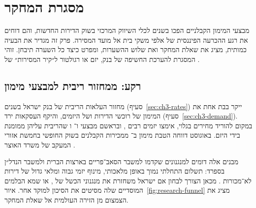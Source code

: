 \chapter{מסגרת המחקר}
\label{ch:research-framework}

\begin{managerbox}
מבצעי המימון הקבלניים הפכו בשנים  לכלי השיווק המרכזי בשוק הדירות החדשות, והם דוחים את רגע ההכרעה הפיננסית של אלפי משקי בית אל מועד המסירה. פרק זה מגדיר את הבעיה כמותית, מציג את שאלת המחקר ואת שלוש ההשערות, ומפרט כיצד כל השערה תיבחן. זוהי המסגרת להערכת החשיפה של בנק, יזם או רגולטור ל״קיר המסירות״ של .
\end{managerbox}

\section{רקע: ממחזור ריבית למבצעי מימון}
\label{sec:ch1-background}

מחזור העלאות הריבית של בנק ישראל בשנים  (סעיף~\ref{sec:ch3-rates}) ייקר בבת אחת את המימון של רוכשי הדירות ושל היזמים, והיקף העסקאות ירד (סעיף~\ref{sec:ch3-demand}). במקום להוריד מחירים בגלוי, אימצו יזמים רבים , ובראשם מבצעי  ו־ ו שהריבית עליהן ממומנת בידי היזם. באוגוסט  דווחה הטבת מימון ב־ ממכירות הקבלנים בשוק החופשי בחמשת אזורי המעקב של משרד האוצר \cite{mof_review_2026_08,nadlancenter_2026_08_promos}.

מבנים אלה דומים למנגנונים שקדמו למשבר הסאב־פריים בארצות הברית ולמשבר הנדל״ן בספרד: תשלום התחלתי נמוך באופן מלאכותי, מינוף יזמי גבוה ומלאי גדול של דירות לא־מכורות \cite{fcic2011,akin2014}. מכאן הצורך לבחון אם ישראל משחזרת את מנגנוני הכשל של , או שמא הבלמים המוסדיים שלה מסיטים את הסיכון למוקד אחר. איור~\ref{fig:research-funnel} מציג את הצמצום מן הזירה העולמית אל שאלת המחקר.

